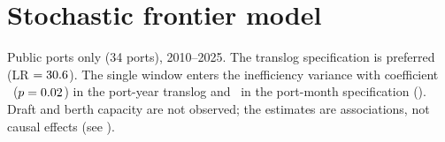 \section{Stochastic frontier model}
\label{app:efficiency}


Public ports only (34 ports), 2010--2025. The translog specification is
preferred (LR $=30.6$). The single window enters the inefficiency variance
with coefficient \SfaPspTl\ ($p=0.02$) in the port-year translog and
\SfaPspPm\ in the port-month specification (). Draft and berth
capacity are not observed; the estimates are associations, not causal effects
(see ).



\PROSA

\FloatBarrier
